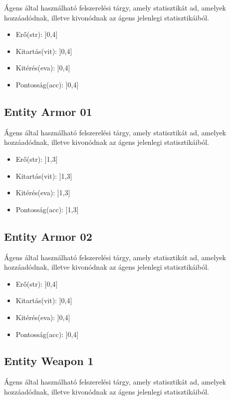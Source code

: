 Ágens által használható felszerelési tárgy, amely statisztikát ad, amelyek hozzáadódnak, illetve kivonódnak az ágens jelenlegi statisztikáiból.

\begin{itemize}
    \item Erő(str): ]0,4]
    \item Kitartás(vit): ]0,4]
    \item Kitérés(eva): ]0,4]
    \item Pontosság(acc): ]0,4]
\end{itemize}

\subsection{Entity Armor 01}

Ágens által használható felszerelési tárgy, amely statisztikát ad, amelyek hozzáadódnak, illetve kivonódnak az ágens jelenlegi statisztikáiból.

\begin{itemize}
    \item Erő(str): ]1,3]
    \item Kitartás(vit): ]1,3]
    \item Kitérés(eva): ]1,3]
    \item Pontosság(acc): ]1,3]
\end{itemize}

\subsection{Entity Armor 02}


Ágens által használható felszerelési tárgy, amely statisztikát ad, amelyek hozzáadódnak, illetve kivonódnak az ágens jelenlegi statisztikáiból.

\begin{itemize}
    \item Erő(str): ]0,4]
    \item Kitartás(vit): ]0,4]
    \item Kitérés(eva): ]0,4]
    \item Pontosság(acc): ]0,4]
\end{itemize}

\subsection{Entity Weapon 1}

Ágens által használható felszerelési tárgy, amely statisztikát ad, amelyek hozzáadódnak, illetve kivonódnak az ágens jelenlegi statisztikáiból.

